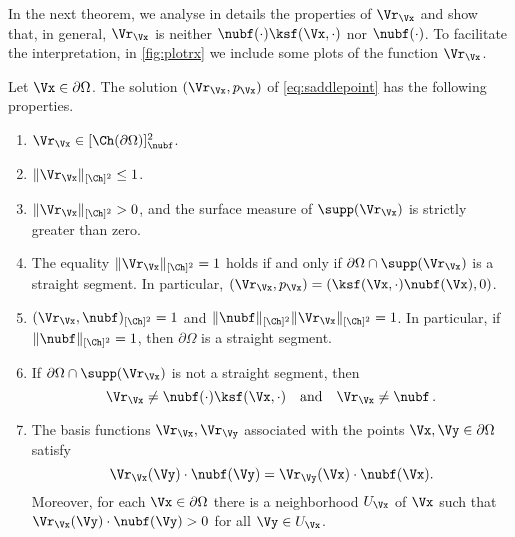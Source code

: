 \documentclass{siamart1116}
\numberwithin{theorem}{section}
\begin{document}
In the next theorem, we analyse in details the properties of $\Vr_\Vx$ and show
that, in general, $\Vr_\Vx$ is neither $\nubf(\cdot)\ksf(\Vx,\cdot)$ nor $\nubf(\cdot)$.
To facilitate the interpretation, in \cref{fig:plotrx} we include some plots of
the function $\Vr_\Vx$.
\begin{theorem}\label{thm:propsofrx}
Let $\Vx\in \partial \Omega$. The solution $(\Vr_\Vx, p_\Vx)$ of \cref{eq:saddlepoint} has the following properties.
\begin{enumerate}[$(a)$]

\item \label{it:normal}
$\Vr_\Vx\in[\Ch(\partial \Omega)]^2_{\nubf}$.
\item \label{it:upperboundnorm}
$\|\Vr_\Vx\|_{[\Ch]^2}\le 1$.

\item \label{it:nonzero}
$\|\Vr_\Vx\|_{[\Ch]^2}>0$, and the surface measure of 
$\supp(\Vr_\Vx)$ is strictly greater than zero.

\item \label{it:norm1implies}
The equality $\|\Vr_\Vx\|_{[\Ch]^2} = 1$ holds if and only if $\partial \Omega\cap \supp(\Vr_\Vx)$
is a straight segment.
In particular, $(\Vr_\Vx, p_\Vx)  = (\ksf(\Vx,\cdot) \nubf(\Vx), 0)$.

\item \label{it:prodnuH}
$(\Vr_\Vx,\nubf)_{[\Ch]^2}=1$ and $\|\nubf\|_{[\Ch]^2}\|\Vr_\Vx\|_{[\Ch]^2}= 1$.  In particular,  if $\|\nubf\|_{[\Ch]^2}=1$, then $\partial \Omega$
is a straight segment.

\item \label{it:whatrxisnot}
If $\partial \Omega\cap \supp(\Vr_\Vx)$
is not a straight segment, then
\begin{equation}
\Vr_\Vx\neq\nubf(\cdot) \ksf(\Vx,\cdot) \quad \text{and} \quad \Vr_\Vx\neq\nubf\,.
\end{equation}

\item \label{it:symm}
The basis functions $\Vr_\Vx,\Vr_\Vy$ associated with the points $\Vx, \Vy\in \partial \Omega$
satisfy
\begin{equation}\label{eq:basis_rx_2}
 \Vr_{\Vx}(\Vy)\cdot \nubf(\Vy) = \Vr_{\Vy}(\Vx)\cdot \nubf(\Vx).
\end{equation}
Moreover, for each $\Vx\in \partial \Omega$ there is a neighborhood $U_\Vx$ of $\Vx$
such that $\Vr_\Vx(\Vy)\cdot \nubf(\Vy)>0$ for all $\Vy\in U_\Vx$.
\end{enumerate}
\end{theorem}
\end{document}
